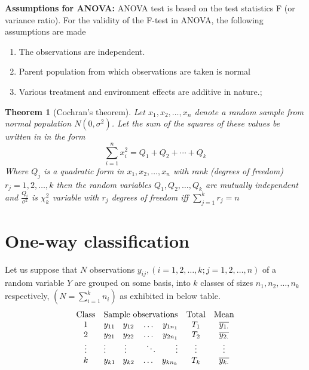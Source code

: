 \documentclass[oneside,11pt,pdftex]{book}%
\numberwithin{equation}{section}
\newtheorem{theorem}{Theorem}[chapter]%
\numberwithin{section}{chapter}
\numberwithin{equation}{chapter}
\begin{document}
\textbf{Assumptions for ANOVA:} ANOVA test is based on the test statistics F (or variance ratio). For the validity of the F-test in ANOVA, the following assumptions are made
\begin{enumerate}
	\item The observations are independent.
	\item Parent population from which observations are taken is normal
	\item Various treatment and environment effects are additive in nature.;
\end{enumerate}

\begin{theorem}[Cochran's theorem]
	Let $ x_1, x_2, \dots, x_n $ denote a random sample from normal population $ N(0, \sigma^2) $. Let the sum of the squares of these values be written in in the form \[ \sum_{i=1}^n x_i^2 = Q_1+Q_2+\cdots+Q_k \]
	Where $ Q_j $ is a quadratic form in $ x_1, x_2, \dots, x_n$ with rank (degrees of freedom) $ r_j=1,2,\dots,k $ then the random variables $ Q_1, Q_2, \dots, Q_k $ are mutually independent and $ \frac{Q_i}{\sigma^2} $ is $ \chi^2_k $ variable with $ r_j $ degrees of freedom iff $ \sum_{j=1}^k r_j=n $
\end{theorem}

\section{One-way classification}
Let us suppose that $ N $ observations $ y_{ij}, (i=1,2,\dots, k; j=1,2,\dots, n)$ of a random variable $ Y $ are grouped on some basis, into $ k $ classes of sizes $ n_1, n_2, \dots, n_k $ respectively, $ \left(N=\sum_{i=1}^{k} n_i \right) $ as exhibited in below table.
\[
\begin{matrix} 
	\text{Class} & \text{Sample observations} & \text{Total} & \text{Mean} \\
	1 & y_{11} \hfill y_{12} \hfill \dots \hfill y_{1n_1} & T_1 & \overline{y_{1.}}\\
	2 & y_{21} \hfill y_{22} \hfill \dots \hfill y_{2n_1} & T_2 & \overline{y_{2.}}\\
	\vdots & \vdots \hfill \vdots \hfill \ddots \hfill \vdots & \vdots & \vdots \\
	k & y_{k1} \hfill y_{k2} \hfill \dots \hfill y_{kn_{k}} & T_k & \overline{y_{k.}}
\end{matrix}
\]
\end{document}
